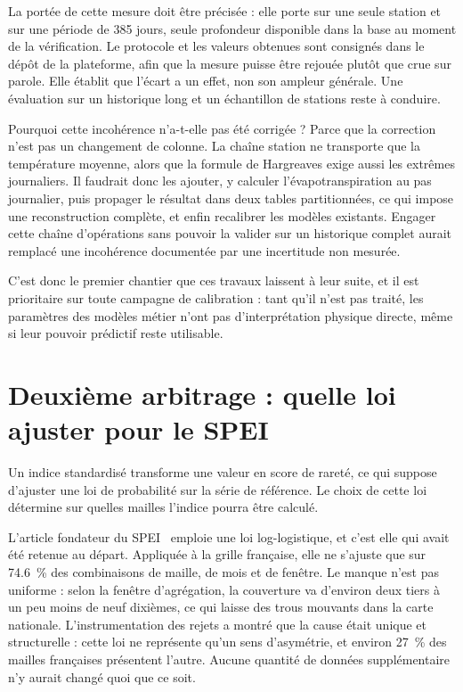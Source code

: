 La portée de cette mesure doit être précisée : elle porte sur une seule station et sur une
période de \num{385} jours, seule profondeur disponible dans la base au moment de la
vérification. Le protocole et les valeurs obtenues sont consignés dans le dépôt de la plateforme,
afin que la mesure puisse être rejouée plutôt que crue sur parole. Elle établit que l'écart a un effet, non son ampleur générale. Une évaluation sur
un historique long et un échantillon de stations reste à conduire.

Pourquoi cette incohérence n'a-t-elle pas été corrigée ? Parce que la correction n'est pas un
changement de colonne. La chaîne station ne transporte que la température moyenne, alors que la
formule de Hargreaves exige aussi les extrêmes journaliers. Il faudrait donc les ajouter, y
calculer l'évapotranspiration au pas journalier, puis propager le résultat dans deux tables
partitionnées, ce qui impose une reconstruction complète, et enfin recalibrer les modèles
existants. Engager cette chaîne d'opérations sans pouvoir la valider sur un historique complet
aurait remplacé une incohérence documentée par une incertitude non mesurée.

C'est donc le premier chantier que ces travaux laissent à leur suite, et il est prioritaire sur
toute campagne de calibration : tant qu'il n'est pas traité, les paramètres des modèles métier
n'ont pas d'interprétation physique directe, même si leur pouvoir prédictif reste utilisable.

\section{Deuxième arbitrage : quelle loi ajuster pour le SPEI}
\label{sec:glo}

Un indice standardisé transforme une valeur en score de rareté, ce qui suppose d'ajuster une loi
de probabilité sur la série de référence. Le choix de cette loi détermine sur quelles mailles
l'indice pourra être calculé.

L'article fondateur du SPEI~\cite{vicenteserrano2010spei} emploie une loi log-logistique, et
c'est elle qui avait été retenue au départ. Appliquée à la grille française, elle ne s'ajuste que
sur \SI{74,6}{\percent} des combinaisons de maille, de mois et de fenêtre. Le manque n'est pas
uniforme : selon la fenêtre d'agrégation, la couverture va d'environ deux tiers à un peu moins de
neuf dixièmes, ce qui laisse des trous mouvants dans la carte nationale. L'instrumentation
des rejets a montré que la cause était unique et structurelle : cette loi ne représente qu'un
sens d'asymétrie, et environ \SI{27}{\percent} des mailles françaises présentent l'autre. Aucune
quantité de données supplémentaire n'y aurait changé quoi que ce soit.

